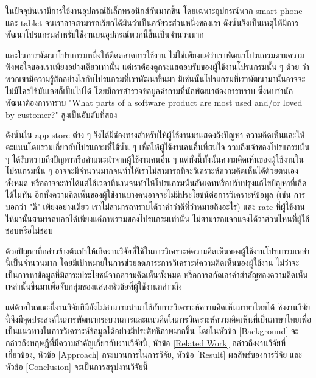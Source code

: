 
ในปัจจุบันเรามีการใช้งานอุปกรณ์อิเล็กทรอนิกส์กันมากขึ้น โดยเฉพาะอุปกรณ์พวก smart phone และ tablet จนเราอาจสามารถเรียกได้มันว่าเป็นอวัยวะส่วนหนึ่งของเรา ดังนั้นจึงเป็นเหตุให้มีการพัฒนาโปรแกรมสำหรับใช้งานบนอุปกรณ์พวกนี้ขึ้นเป็นจำนวนมาก

และในการพัฒนาโปรแกรมหนึ่งให้ติดตลาดการใช้งาน ไม่ใช่เพียงแค่ว่าเราพัฒนาโปรแกรมตามความพึงพอใจของเราเพียงอย่างเดียวเท่านั้น แต่เราต้องดูกระแสตอบรับของผู้ใช้งานโปรแกรมนั้น ๆ ด้วย ว่าพวกเขามีความรู้สึกอย่างไรกับโปรแกรมที่เราพัฒนาขึ้นมา มิเช่นนั้นโปรแกรมที่เราพัฒนามานั้นอาจจะไม่มีใครใช้มันเลยก็เป็นไปได้ โดยมีการสำรวจข้อมูลคำถามที่นักพัฒนาต้องการทราบ ซึ่งพบว่านักพัฒนาต้องการทราบ "What parts of a software product are most used and/or loved by customer?" สูงเป็นอับดับที่สอง \cite{145Q}

ดังนั้นใน app store ต่าง ๆ จึงได้มีช่องทางสำหรับให้ผู้ใช้งานมาแสดงถึงปัญหา ความคิดเห็นและให้คะแนนโดยรวมเกี่ยวกับโปรแกรมที่ใช้นั้น ๆ เพื่อให้ผู้ใช้งานคนอื่นที่สนใจ รวมถึงเจ้าของโปรแกรมนั้น ๆ  ได้รับทราบถึงปัญหาหรือคำแนะนำจากผู้ใช้งานคนอื่น ๆ  แต่ทั้งนี้ทั้งนั้นความคิดเห็นของผู้ใช้งานในโปรแกรมนั้น ๆ อาจจะมีจำนวนมากจนทำให้เราไม่สามารถที่จะวิเคราะห์ความคิดเห็นได้ด้วยตนเองทั้งหมด หรืออาจจะทำได้แต่ใช้เวลาที่นานจนทำให้โปรแกรมนั้นอัพเดทหรือปรับปรุงแก้ไขปัญหาที่เกิดได้ไม่ทัน อีกทั้งความคิดเห็นของผู้ใช้งานบางคนอาจจะไม่มีประโยชน์ต่อการวิเคราะห์ข้อมูล (เช่น การบอกว่า "ดี" เพียงอย่างเดียว เราไม่สามารถทราบได้ว่าคำว่าดีที่ว่าหมายถึงอะไร) และ rate ที่ผู้ใช้งานให้มานั้นสามารถบอกได้เพียงแค่ภาพรวมของโปรแกรมเท่านั้น ไม่สามารถแจกแจงได้ว่าส่วนไหนที่ผู้ใช้ชอบหรือไม่ชอบ

ด้วยปัญหาที่กล่าวข้างต้นทำให้เกิดงานวิจัยที่ใช้ในการวิเคราะห์ความคิดเห็นของผู้ใช้งานโปรแกรมเหล่านี้เป็นจำนวนมาก โดยมีเป้าหมายในการช่วยลดภาระการวิเคราะห์ความคิดเห็นของผู้ใช้งาน ไม่ว่าจะเป็นการหาข้อมูลที่มีสาระประโยชน์จากความคิดเห็นทั้งหมด หรือการสกัดเอาคำสำคัญของความคิดเห็นเหล่านั้นขึ้นมาเพื่อจับกลุ่มของแสดงหัวข้อที่ผู้ใช้งานกล่าวถึง

แต่ด้วยในขณะนี้งานวิจัยที่มียังไม่สามารถนำมาใช้กับการวิเคราะห์ความคิดเห็นภาษาไทยได้  ซึ่งงานวิจัยนี้จึงมีจุดประสงค์ในการพัฒนากระบวนการและแนวคิดในการวิเคราะห์ความคิดเห็นที่เป็นภาษาไทยเพื่อเป็นแนวทางในการวิเคราะห์ข้อมูลได้อย่างมีประสิทธิภาพมากขึ้น โดยในหัวข้อ \ref{Background} จะกล่าวถึงทฤษฎีที่มีความสำคัญเกี่ยวกับงานวิจัยนี้, หัวข้อ \ref{Related Work} กล่าวถึงงานวิจัยที่เกี่ยวข้อง, หัวข้อ \ref{Approach} กระบวนการในการวิจัย, หัวข้อ \ref{Result} ผลลัพธ์ของการวิจัย และหัวข้อ \ref{Conclusion} จะเป็นการสรุปงานวิจัยนี้
